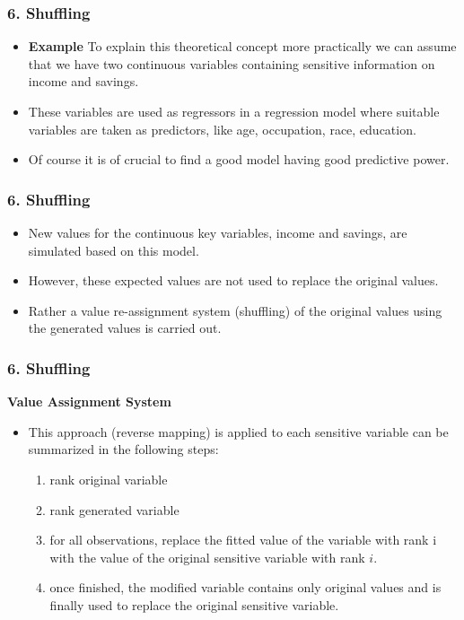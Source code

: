 \documentclass{beamer}
\begin{document}
\begin{frame}
	\frametitle{6. Shuffling}
	\begin{itemize}
		\item \textbf{Example} To explain this theoretical concept more practically we can assume that we have
		two continuous variables containing sensitive information on income and savings.
		\item These variables are used as regressors in a regression model where suitable variables
		are taken as predictors, like age, occupation, race, education. 
		\item Of course it is of
		crucial to find a good model having good predictive power. 
	\end{itemize}
\end{frame}
\begin{frame}
	\frametitle{6. Shuffling}
	\begin{itemize}
		\item New values for the
		continuous key variables, income and savings, are simulated based on this model.
		
		\item However, these expected
		values are not used to replace the original values. 
		\item Rather a value re-assignment system (shuffling) of the original
		values using the generated values is carried out. 
		
		
	\end{itemize}
\end{frame}
\begin{frame}
	\frametitle{6. Shuffling}
	\textbf{Value Assignment System}
	\begin{itemize}
		\item This approach (reverse mapping)
		is applied to each sensitive variable can be summarized in the following steps:
		\begin{enumerate}
			\item rank original variable
			\item rank generated variable
			\item for all observations, replace the fitted value of the variable with rank i
			with the value of the original sensitive variable with rank $i$.
			\item once finished, the modiﬁed variable contains only original values and is finally
			used to replace the original sensitive variable.
		\end{enumerate}
	\end{itemize}
\end{frame}
\end{document}
